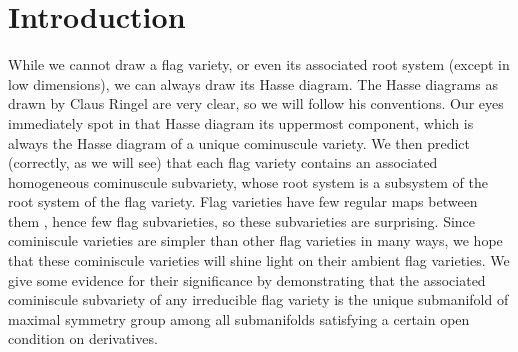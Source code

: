 \documentclass[a4paper,10pt]{amsart}
\theoremstyle{remark}
\begin{document}
\section{Introduction}
While we cannot draw a flag variety, or even its associated root system (except in low dimensions), we can always draw its Hasse diagram.
The Hasse diagrams as drawn by Claus Ringel \cite{Ringel2013} are very clear, so we will follow his conventions.
Our eyes immediately spot in that Hasse diagram its uppermost component, which is always the Hasse diagram of a unique cominuscule variety.
We then predict (correctly, as we will see) that each flag variety contains an associated homogeneous cominuscule subvariety, whose root system is a subsystem of the root system of the flag variety.
Flag varieties have few regular maps between them \cite{bakshi2023morphisms,kumar2023nonexistence,naldi2022morphisms,occhetta2023morphisms,Sierra:2021,Tango:1974,Tango:1976}, hence few flag subvarieties, so these subvarieties are surprising.
Since cominiscule varieties are simpler than other flag varieties in many ways, we hope that these cominiscule varieties will shine light on their ambient flag varieties.
We give some evidence for their significance by demonstrating that the associated cominiscule subvariety of any irreducible flag variety is the unique submanifold of maximal symmetry group among all submanifolds satisfying a certain open condition on derivatives.
\end{document}
